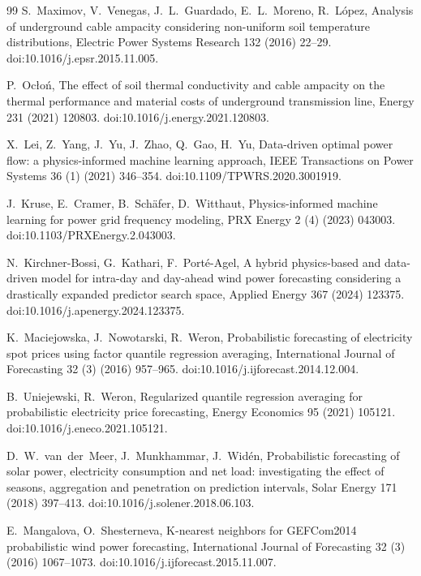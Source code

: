 \documentclass[preprint,3p,times]{elsarticle}
\begin{document}
\begin{thebibliography}{99}
S.~Maximov, V.~Venegas, J.~L.~Guardado, E.~L.~Moreno, R.~L\'opez,
Analysis of underground cable ampacity considering non-uniform soil temperature distributions,
Electric Power Systems Research 132 (2016) 22--29.
doi:10.1016/j.epsr.2015.11.005.

P.~Ocło\'n,
The effect of soil thermal conductivity and cable ampacity on the thermal performance and material costs of underground transmission line,
Energy 231 (2021) 120803.
doi:10.1016/j.energy.2021.120803.

X.~Lei, Z.~Yang, J.~Yu, J.~Zhao, Q.~Gao, H.~Yu,
Data-driven optimal power flow: a physics-informed machine learning approach,
IEEE Transactions on Power Systems 36 (1) (2021) 346--354.
doi:10.1109/TPWRS.2020.3001919.

J.~Kruse, E.~Cramer, B.~Sch\"afer, D.~Witthaut,
Physics-informed machine learning for power grid frequency modeling,
PRX Energy 2 (4) (2023) 043003.
doi:10.1103/PRXEnergy.2.043003.

N.~Kirchner-Bossi, G.~Kathari, F.~Port\'e-Agel,
A hybrid physics-based and data-driven model for intra-day and day-ahead wind power forecasting considering a drastically expanded predictor search space,
Applied Energy 367 (2024) 123375.
doi:10.1016/j.apenergy.2024.123375.

K.~Maciejowska, J.~Nowotarski, R.~Weron,
Probabilistic forecasting of electricity spot prices using factor quantile regression averaging,
International Journal of Forecasting 32 (3) (2016) 957--965.
doi:10.1016/j.ijforecast.2014.12.004.

B.~Uniejewski, R.~Weron,
Regularized quantile regression averaging for probabilistic electricity price forecasting,
Energy Economics 95 (2021) 105121.
doi:10.1016/j.eneco.2021.105121.

D.~W.~van~der~Meer, J.~Munkhammar, J.~Wid\'en,
Probabilistic forecasting of solar power, electricity consumption and net load: investigating the effect of seasons, aggregation and penetration on prediction intervals,
Solar Energy 171 (2018) 397--413.
doi:10.1016/j.solener.2018.06.103.

E.~Mangalova, O.~Shesterneva,
K-nearest neighbors for GEFCom2014 probabilistic wind power forecasting,
International Journal of Forecasting 32 (3) (2016) 1067--1073.
doi:10.1016/j.ijforecast.2015.11.007.


\end{thebibliography}
\end{document}
